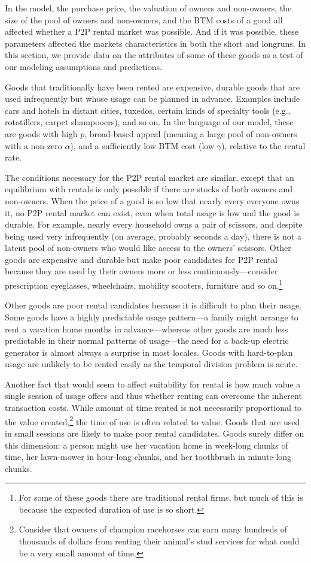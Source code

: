 \documentclass[11pt]{article}
\begin{document}
In the model, the purchase price, the valuation of owners and non-owners, the size of the pool of owners and non-owners, and the BTM costs of a good all affected whether a P2P rental market was possible.
And if it was possible, these parameters affected the markets characteristics in both the short and longruns. 
In this section, we provide data on the attributes of some of these goods as a test of our modeling assumptions and predictions.  

Goods that traditionally have been rented are expensive, durable goods that are used infrequently but whose usage can be planned in advance.
Examples include cars and hotels in distant cities, tuxedos, certain kinds of specialty tools (e.g., rototillers, carpet shampooers), and so on.
In the language of our model, these are goods with high $p$, broad-based appeal (meaning a large pool of non-owners with a non-zero $\alpha$), and a sufficiently low BTM cost (low $\gamma$), relative to the rental rate. 

The conditions necessary for the P2P rental market are similar, except that an equilibrium with rentals is only possible if there are stocks of both owners and non-owners. 
When the price of a good is so low that nearly every everyone owns it, no P2P rental market can exist, even when total usage is low and the good is durable.
For example, nearly every household owns a pair of scissors, and despite being used very infrequently (on average, probably seconds a day), there is not a latent pool of non-owners who would like access to the owners' scissors.  
Other goods are expensive and durable but make poor candidates for P2P rental because they are used by their owners more or less continuously---consider prescription eyeglasses, wheelchairs, mobility scooters, furniture and so on.\footnote{
  For some of these goods there are traditional rental firms, but much of this is because the expected duration of use is so short.  
} 

Other goods are poor rental candidates because it is difficult to plan their usage.
Some goods have a highly predictable usage pattern---a family might arrange to rent a vacation home months in advance---whereas other goods are much less predictable in their normal patterns of usage---the need for a back-up electric generator is almost always a surprise in most locales.  
Goods with hard-to-plan usage are unlikely to be rented easily as the temporal division problem is acute.

Another fact that would seem to affect suitability for rental is how much value a single session of usage offers and thus whether renting can overcome the inherent transaction costs.
While amount of time rented is not necessarily proportional to the value created,\footnote{
  Consider that owners of champion racehorses can earn many hundreds of thousands of dollars from renting their animal's stud services for what could be a very small amount of time.}  
the time of use is often related to value.
Goods that are used in small sessions are likely to make poor rental candidates.
Goods surely differ on this dimension: 
a person might use her vacation home in week-long chunks of time, her lawn-mower in hour-long chunks, and her toothbrush in minute-long chunks. 
\end{document}
